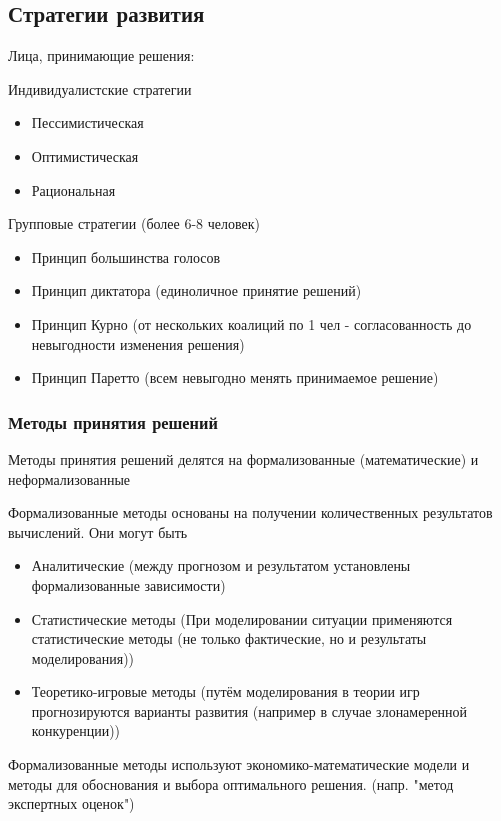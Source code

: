 \documentclass[a4paper,12pt]{report}
\begin{document}
	\subsection{Стратегии развития}
	Лица, принимающие решения:

	Индивидуалистские стратегии
	\begin{itemize}
		\item Пессимистическая
		\item Оптимистическая
		\item Рациональная
	\end{itemize}

		Групповые стратегии (более 6-8 человек)
	\begin{itemize}
		\item Принцип большинства голосов
		\item Принцип диктатора (единоличное принятие решений)
		\item Принцип Курно (от нескольких коалиций по 1 чел - согласованность до невыгодности изменения решения)
		\item Принцип Паретто (всем невыгодно менять принимаемое решение)
	\end{itemize}

\subsubsection{Методы принятия решений}


	Методы принятия решений делятся на формализованные (математические) и неформализованные

	Формализованные методы основаны на получении количественных результатов вычислений.
	Они могут быть
	\begin{itemize}
		\item Аналитические (между прогнозом и результатом установлены формализованные зависимости)
		\item Статистические методы (При моделировании ситуации применяются статистические методы (не
			только фактические, но и результаты моделирования))
		\item Теоретико-игровые методы (путём моделирования в теории игр прогнозируются варианты развития
			(например в случае злонамеренной конкуренции))
	\end{itemize}

	Формализованные методы используют экономико-математические модели и методы для обоснования и выбора 
	 оптимального решения. (напр. "метод экспертных оценок")
\end{document}
